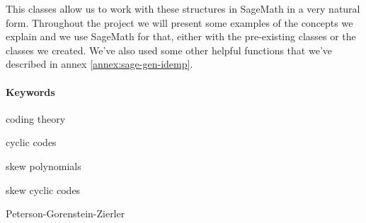 This classes allow us to work with these structures in SageMath in a very natural form.
Throughout the project we will present some examples of the concepts we explain and we use SageMath for that, either with the pre-existing classes or the classes we created.
We've also used some other helpful functions that we've described in annex \ref{annex:sage-gen-idemp}.

\paragraph{Keywords}
\begin{itemize*}[label=,itemsep=4em,itemjoin=\hspace{2em}]
  \item coding theory
  \item cyclic codes 
  \item skew polynomials
  \item skew cyclic codes
  \item Peterson-Gorenstein-Zierler
\end{itemize*}